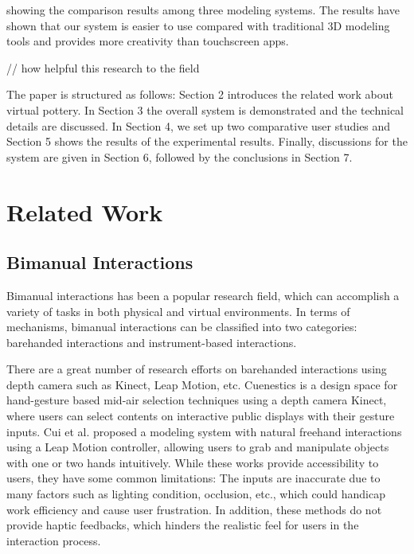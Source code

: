 \documentclass{svjour3}                     %
\begin{document}
 showing the comparison results among three modeling systems. The results have shown that our system is easier to use compared with traditional 3D modeling tools and provides more creativity than touchscreen apps.

// how helpful this research to the field



The paper is structured as follows:
Section 2 introduces the related work about virtual pottery.
In Section 3 the overall system is demonstrated and the technical details are discussed.
In Section 4, we set up two comparative user studies and Section 5 shows the results of the experimental results.
Finally, discussions for the system are given in Section 6, followed by the conclusions in Section 7.

\section{Related Work}
\label{sec:related}

\subsection{Bimanual Interactions}
\label{sec:bimanual}
Bimanual interactions has been a popular research field, which can accomplish a variety of tasks in both physical and virtual environments.
In terms of mechanisms, bimanual interactions can be classified into two categories: barehanded interactions and instrument-based interactions.

There are a great number of research efforts \cite{walter2014cuenesics,cui2016exploration,ramani2015gesture,murugappan2013handy,han2014virtual} on barehanded interactions using depth camera such as Kinect, Leap Motion, etc.
Cuenestics \cite{walter2014cuenesics} is a design space for hand-gesture based mid-air selection techniques using a depth camera Kinect, where users can select contents on interactive public displays with their gesture inputs.
Cui et al. \cite{cui2016exploration} proposed a modeling system with natural freehand interactions using a Leap Motion controller, allowing users to grab and manipulate objects with one or two hands intuitively.
While these works provide accessibility to users, they have some common limitations: The inputs are inaccurate due to many factors such as lighting condition, occlusion, etc., which could handicap work efficiency and cause user frustration.
In addition, these methods do not provide haptic feedbacks, which hinders the realistic feel for users in the interaction process.
\end{document}
